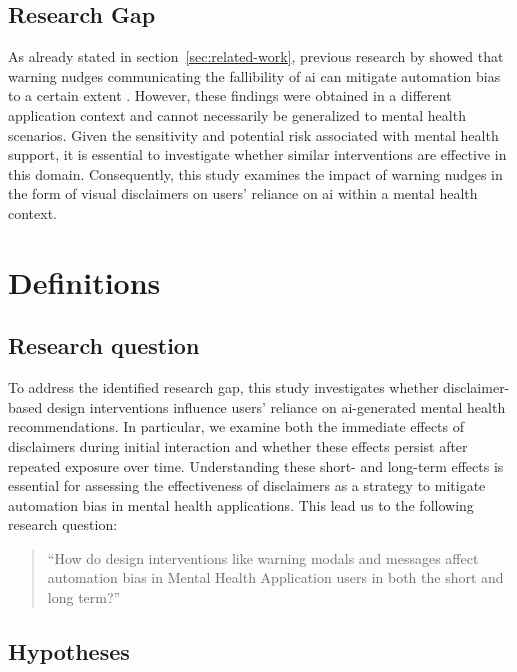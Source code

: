 \documentclass[sigconf,natbib=false]{acmart}
\begin{document}
\subsection{Research Gap}
As already stated in section~\ref{sec:related-work}, previous research by \citeauthor[]{wingerter_mitigating_2025} showed that warning nudges communicating the fallibility of \Gls{ai} can mitigate automation bias to a certain extent \autocite[]{wingerter_mitigating_2025}.
However, these findings were obtained in a different application context and cannot necessarily be generalized to mental health scenarios.
Given the sensitivity and potential risk associated with mental health support, it is essential to investigate whether similar interventions are effective in this domain.
Consequently, this study examines the impact of warning nudges in the form of visual disclaimers on users’ reliance on \Gls{ai} within a mental health context.









\section{Definitions}

\subsection{Research question}
To address the identified research gap, this study investigates whether disclaimer-based design interventions influence users' reliance on \Gls{ai}-generated mental health recommendations.
In particular, we examine both the immediate effects of disclaimers during initial interaction and whether these effects persist after repeated exposure over time.
Understanding these short- and long-term effects is essential for assessing the effectiveness of disclaimers as a strategy to mitigate automation bias in mental health applications.
This lead us to the following research question:
\begin{quote}
    \enquote{How do design interventions like warning modals and messages affect automation bias in Mental Health Application users in both the short and long term?}
\end{quote}

\subsection{Hypotheses}
\end{document}
